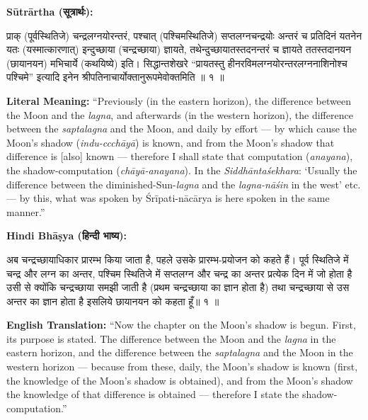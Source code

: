 \documentclass[11pt,a4paper]{article}
\newcommand{\dev}[1]{{\devanagarifont #1}}
\newenvironment{sanskritverse}{%
  \begin{center}\begin{minipage}{0.95\textwidth}
  \setlength{\leftskip}{1em}
  \setlength{\rightskip}{1em}
  \dev
}{\end{minipage}\end{center}}
\newenvironment{paracol}[1]{\begingroup}{\endgroup}
\newcommand{\switchcolumn}[1][]{%
  \ifnum#1=0\relax\else\par\nobreak\vspace{0.5em}\par\nobreak\fi%
}
\begin{document}
\begin{paracol}{2}

\noindent\textbf{Sūtrārtha (\dev{सूत्रार्थः}):}
\begin{sanskritverse}
प्राक् (पूर्वस्थितिजे) चन्द्रलग्नयोरन्तरं, पश्चात् (पश्चिमस्थितिजे) सप्तलग्नचन्द्रयोः
अन्तरं च प्रतिदिनं यतनेन यतः (यस्मात्कारणात्) इन्दुच्छाया (चन्द्रच्छाया) ज्ञायते,
तथेन्दुच्छायातस्तदनन्तरं च ज्ञायते ततस्तदानयन (छायानयन) मभिचार्ये (कथयिष्ये) इति।
सिद्धान्तशेखरे ``प्रायतस्तु हीनरविमलग्नयोरन्तरलग्ननाशिनोश्च पश्चिमे'' इत्यादि
इनेन श्रीपतिनाचार्योक्तानुरूपमेवोक्तमिति ॥ १ ॥
\end{sanskritverse}

\switchcolumn

\textbf{Literal Meaning:} ``Previously (in the eastern horizon), the difference between the Moon and the \textit{lagna}, and afterwards (in the western horizon), the difference between the \textit{saptalagna} and the Moon, and daily by effort --- by which cause the Moon's shadow (\textit{indu-ccchāyā}) is known, and from the Moon's shadow that difference is [also] known --- therefore I shall state that computation (\textit{anayana}), the shadow-computation (\textit{chāyā-anayana}). In the \textit{Siddhāntaśekhara}: `Usually the difference between the diminished-Sun-\textit{lagna} and the \textit{lagna-nāśin} in the west' etc. --- by this, what was spoken by Śrīpati-nācārya is here spoken in the same manner.''

\end{paracol}

\vspace{0.5em}

\begin{paracol}{2}

\noindent\textbf{Hindi Bhāṣya (\dev{हिन्दी भाष्य}):}
\begin{sanskritverse}
अब चन्द्रच्छायाधिकार प्रारम्भ किया जाता है, पहले उसके प्रारम्भ-प्रयोजन को कहते हैं।
पूर्व स्थितिजे में चन्द्र और लग्न का अन्तर, पश्चिम स्थितिजे में सप्तलग्न और चन्द्र का अन्तर
प्रत्येक दिन में जो होता है उसी से क्योंकि चन्द्रच्छाया समझी जाती है (प्रथम चन्द्रच्छाया
का ज्ञान होता है) तथा चन्द्रच्छाया से उस अन्तर का ज्ञान होता है इसलिये छायानयन को
कहता हूँ॥ १ ॥
\end{sanskritverse}

\switchcolumn

\textbf{English Translation:} ``Now the chapter on the Moon's shadow is begun. First, its purpose is stated. The difference between the Moon and the \textit{lagna} in the eastern horizon, and the difference between the \textit{saptalagna} and the Moon in the western horizon --- because from these, daily, the Moon's shadow is known (first, the knowledge of the Moon's shadow is obtained), and from the Moon's shadow the knowledge of that difference is obtained --- therefore I state the shadow-computation.''

\end{paracol}
\end{document}
